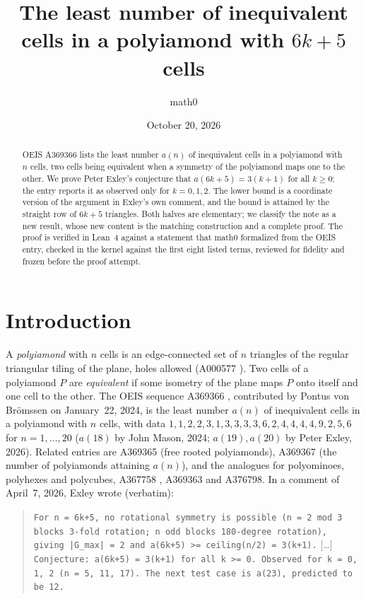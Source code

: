 \documentclass[11pt]{amsart}
\title[Inequivalent cells of $(6k+5)$-iamonds]{The least number of inequivalent cells in a polyiamond with $6k+5$ cells}
\author{math0}
\date{October 20, 2026}
\theoremstyle{plain}
\theoremstyle{definition}
\begin{document}
\begin{abstract}
OEIS A369366 lists the least number $a(n)$ of inequivalent cells in a polyiamond with $n$ cells, two cells being equivalent when a symmetry of the polyiamond maps one to the other. We prove Peter Exley's conjecture that $a(6k+5)=3(k+1)$ for all $k\ge0$; the entry reports it as observed only for $k=0,1,2$. The lower bound is a coordinate version of the argument in Exley's own comment, and the bound is attained by the straight row of $6k+5$ triangles. Both halves are elementary; we classify the note as a new result, whose new content is the matching construction and a complete proof. The proof is verified in Lean~4 against a statement that math0 formalized from the OEIS entry, checked in the kernel against the first eight listed terms, reviewed for fidelity and frozen before the proof attempt.
\end{abstract}
\maketitle

\section{Introduction}

A \emph{polyiamond} with $n$ cells is an edge-connected set of $n$ triangles of the regular triangular tiling of the plane, holes allowed (A000577 \cite{A000577}). Two cells of a polyiamond $P$ are \emph{equivalent} if some isometry of the plane maps $P$ onto itself and one cell to the other. The OEIS sequence A369366 \cite{A369366}, contributed by Pontus von Brömssen on January~22, 2024, is the least number $a(n)$ of inequivalent cells in a polyiamond with $n$ cells, with data $1,1,2,2,3,1,3,3,3,3,6,2,4,4,4,4,9,2,5,6$ for $n=1,\dots,20$ ($a(18)$ by John Mason, 2024; $a(19),a(20)$ by Peter Exley, 2026). Related entries are A369365 \cite{A369365} (free rooted polyiamonds), A369367 \cite{A369367} (the number of polyiamonds attaining $a(n)$), and the analogues for polyominoes, polyhexes and polycubes, A367758 \cite{A367758}, A369363 and A376798. In a comment of April~7, 2026, Exley wrote (verbatim):
\begin{quote}\raggedright\small
\texttt{For n = 6k+5, no rotational symmetry is possible (n = 2 mod 3 blocks 3-fold rotation; n odd blocks 180-degree rotation), giving |G\_max| = 2 and a(6k+5) >= ceiling(n/2) = 3(k+1).} [\dots]\\[2pt]
\texttt{Conjecture: a(6k+5) = 3(k+1) for all k >= 0. Observed for k = 0, 1, 2 (n = 5, 11, 17). The next test case is a(23), predicted to be 12.}
\end{quote}
\end{document}
